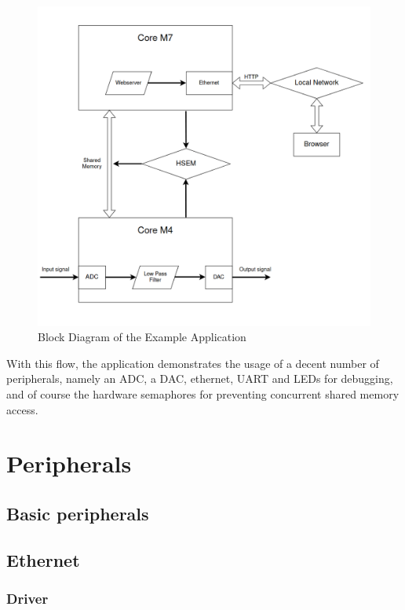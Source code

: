 \begin{figure}[!ht]
    \centering
    \includegraphics[width=150mm, keepaspectratio]{figures/example-app-flowchart.png}
    \caption{Block Diagram of the Example Application}
    \label{fig:hsem-interrupt-sd}
\end{figure}

With this flow, the application demonstrates the usage of  a decent number of peripherals, namely an ADC, a DAC, ethernet, UART and LEDs for debugging, and of course the hardware semaphores for preventing concurrent shared memory access.

\section{Peripherals}


\subsection{Basic peripherals}

\subsection{Ethernet}

\subsubsection{Driver}
